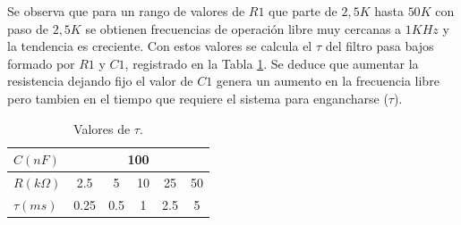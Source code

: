 \documentclass[10pt,a4paper]{IEEEtran}
\begin{document}
Se observa que para un rango de valores de $R1$ que parte de $2,5K$ hasta $50K$ con paso de $2,5K$ se obtienen frecuencias de operación libre 
muy cercanas a $1KHz$ y la tendencia es creciente. Con estos valores se calcula el $\tau$ del filtro pasa bajos formado por 
$R1$ y $C1$, registrado en la Tabla \ref{TablaTau}. Se deduce que aumentar la resistencia dejando fijo el valor de $C1$ genera un aumento 
en la frecuencia libre pero tambien en el tiempo que requiere el sistema para engancharse ($\tau$).\\
\begin{table}[]
    \centering
    \begin{tabular}{|l|c|c|c|c|c|}
    \hline
    $C (nF)$ & \multicolumn{5}{c|}{100} \\ \hline
    $R (k\Omega)$ & 2.5 & 5 & 10 & 25 & 50 \\ \hline
    $\tau (ms)$ & 0.25 & 0.5 & 1 & 2.5 & 5 \\ \hline
    \end{tabular}
    \caption{Valores de $\tau$.}
    \label{TablaTau}
\end{table}
\end{document}
